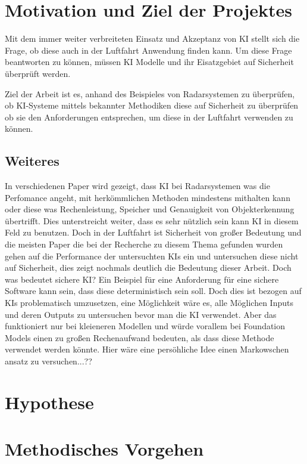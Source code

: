 

\chapter{Motivation und Ziel der Projektes}
Mit dem immer weiter verbreiteten Einsatz und Akzeptanz von \ac{KI} stellt sich die Frage, 
ob diese auch in der Luftfahrt Anwendung finden kann. Um diese Frage beantworten zu können, 
müssen \ac{KI} Modelle und ihr Eisatzgebiet auf Sicherheit überprüft werden. 

Ziel der Arbeit ist es, anhand des Beispieles von Radarsystemen zu überprüfen, 
ob KI-Systeme mittels bekannter Methodiken diese auf Sicherheit zu überprüfen ob sie den Anforderungen entsprechen, 
um diese in der Luftfahrt verwenden zu können.

\section{Weiteres}
In verschiedenen Paper wird gezeigt, dass \ac{KI} bei Radarsystemen was die Perfomance angeht, mit herkömmlichen Methoden 
mindestens mithalten kann oder diese was Rechenleistung, Speicher und Genauigkeit von Objekterkennung übertrifft. 
Dies unterstreicht weiter, dass es sehr nützlich sein kann \ac{KI} in diesem Feld zu benutzen. Doch in der Luftfahrt ist 
Sicherheit von großer Bedeutung und die meisten Paper die bei der Recherche zu diesem Thema gefunden wurden gehen 
auf die Performance der untersuchten KIs ein und untersuchen diese nicht auf Sicherheit, dies zeigt nochmals deutlich die Bedeutung 
dieser Arbeit. Doch was bedeutet sichere \ac{KI}? Ein Beispiel für eine Anforderung für eine sichere Software kann sein, 
dass diese deterministisch sein soll. Doch dies ist bezogen auf KIs problematisch umzusetzen, eine Möglichkeit wäre es, 
alle Möglichen Inputs und deren Outputs zu untersuchen bevor man die \ac{KI} verwendet. Aber das funktioniert nur bei 
kleieneren Modellen und würde vorallem bei Foundation Models einen zu großen Rechenaufwand bedeuten, als dass diese Methode 
verwendet werden könnte. Hier wäre eine persöhliche Idee einen Markowschen ansatz zu versuchen...??

\chapter{Hypothese}

\chapter{Methodisches Vorgehen}
